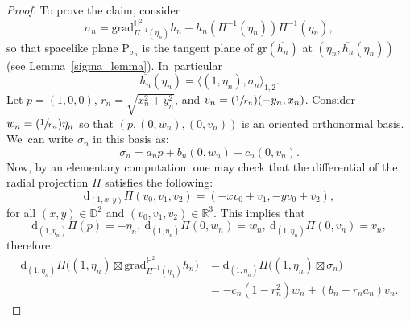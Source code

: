 \documentclass[11pt]{article}
\newcommand{\Psfrac}[2]{(\sfrac{#1}{#2})}
\theoremstyle{plain}
\theoremstyle{definition}
\newcommand{\grad}{\mathrm{grad}^{\mathbb{H}^2}}
\newcommand{\inner}[1] {\langle #1 \rangle}
\begin{document}
\begin{proof}
To prove the claim, consider
\[
\sigma_n=\grad_{\Pi^{-1}(\eta_n)}h_n-h_n(\Pi^{-1}(\eta_n))\Pi^{-1}(\eta_n),
\]
so that spacelike plane $\mathrm{P}_{\sigma_n}$ is the tangent plane of $\mathrm{gr}(\overline{h_n})$ at $(\eta_n,\overline{h_n}(\eta_n))$ (see Lem\-ma~\ref{sigma_lemma}). In~particular
\begin{equation}\label{u(pi2)}
\overline{h_n}(\eta_n)= \inner{(1,\eta_n),\sigma_n}_{1,2}.
\end{equation}
Let $p = (1, 0, 0)$, $r_n = \sqrt{x_n^2 + y_n^2}$, and $v_n = \Psfrac{1}{r_n}(-y_n, x_n)$. Consider $w_n = \Psfrac{1}{r_n}\eta_n$ so that $(p, (0,w_n), (0,v_n))$ is an oriented orthonormal basis. We~can write $\sigma_n$ in this basis as: \begin{equation}\label{sigma_n}
\sigma_n=a_np+b_n(0,w_n)+c_n(0,v_n).
\end{equation}
Now, by an elementary computation, one may check that the differential of the radial projection $\Pi$ satisfies the following:
\[
\mathrm{d}_{(1,x,y)}\Pi(v_0,v_1,v_2)=(-x v_0+v_1, -y v_0+v_2),
\]
for all $(x,y)\in\mathbb{D}^2$ and $(v_0,v_1,v_2)\in\mathbb{R}^3$. This implies that
\[
\mathrm{d}_{(1,\eta_n)}\Pi(p) = -\eta_n,\ \mathrm{d}_{(1,\eta_n)}\Pi(0,w_n) = w_n, \ \mathrm{d}_{(1,\eta_n)}\Pi(0,v_n) = v_n,
\]
therefore:
\begin{equation}\label{pullback_of_vector_field2}
\begin{aligned}
\mathrm{d}_{(1,\eta_n)}\Pi\!\bigl((1,\eta_n)\boxtimes
\grad_{\Pi^{-1}(\eta_n)} h_n\bigr)
&= \mathrm{d}_{(1,\eta_n)}\Pi\!\bigl((1,\eta_n)\boxtimes\sigma_n\bigr) \\
&= -c_n(1-r_n^2)w_n + (b_n-r_na_n)v_n.
\end{aligned}
\end{equation}


\end{proof}
\end{document}

